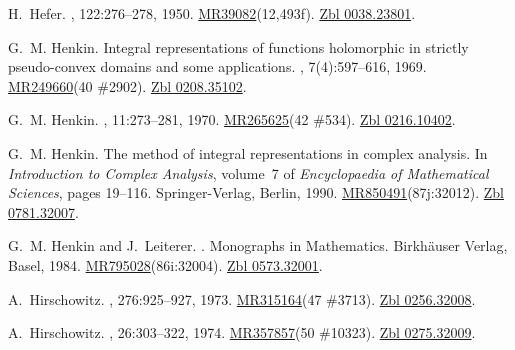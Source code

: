\documentclass[11pt,a4paper, final, twoside]{article}
\numberwithin{equation}{section}
\begin{document}
\begin{appendices}
\begin{thebibliography}{100}
H.~Hefer.
, 122:276--278, 1950.
\newblock
  \href{http://www.ams.org/mathscinet-getitem?mr=39082}{MR39082}(12,493f).
  \href{http://zbmath.org/?q=an:0038.23801}{Zbl 0038.23801}.

G.~M. Henkin.
\newblock Integral representations of functions holomorphic in strictly
  pseudo-convex domains and some applications.
, 7(4):597--616, 1969.
\newblock \href{http://www.ams.org/mathscinet-getitem?mr=249660}{MR249660}(40
  \#2902). \href{http://zbmath.org/?q=an:0208.35102}{Zbl 0208.35102}.

G.~M. Henkin.
, 11:273--281, 1970.
\newblock \href{http://www.ams.org/mathscinet-getitem?mr=265625}{MR265625}(42
  \#534). \href{http://zbmath.org/?q=an:0216.10402}{Zbl 0216.10402}.

G.~M. Henkin.
\newblock The method of integral representations in complex analysis.
\newblock In {\em Introduction to Complex Analysis}, volume~7 of {\em
  Encyclopaedia of Mathematical Sciences}, pages 19--116. Springer-Verlag,
  Berlin, 1990.
\newblock
  \href{http://www.ams.org/mathscinet-getitem?mr=850491}{MR850491}(87j:32012).
  \href{http://zbmath.org/?q=an:0781.32007}{Zbl 0781.32007}.

G.~M. Henkin and J.~Leiterer.
.
\newblock Monographs in Mathematics. Birkh{\"a}user Verlag, Basel, 1984.
\newblock
  \href{http://www.ams.org/mathscinet-getitem?mr=795028}{MR795028}(86i:32004).
  \href{http://zbmath.org/?q=an:0573.32001}{Zbl 0573.32001}.

A.~Hirschowitz.
, 276:925--927, 1973.
\newblock \href{http://www.ams.org/mathscinet-getitem?mr=315164}{MR315164}(47
  \#3713). \href{http://zbmath.org/?q=an:0256.32008}{Zbl 0256.32008}.

A.~Hirschowitz.
, 26:303--322, 1974.
\newblock \href{http://www.ams.org/mathscinet-getitem?mr=357857}{MR357857}(50
  \#10323). \href{http://zbmath.org/?q=an:0275.32009}{Zbl 0275.32009}.


\end{thebibliography}
\end{appendices}
\end{document}

